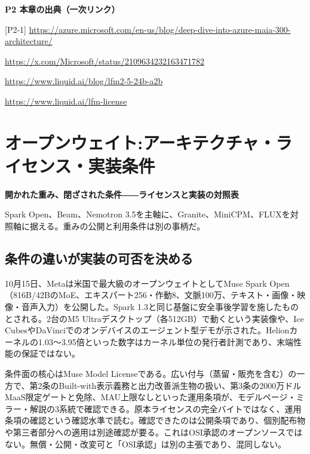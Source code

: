 \documentclass[lualatex,a4paper,10pt]{jlreq}
\begin{document}
\begin{tcolorbox}[colback=white,colframe=SurveyRule,arc=1mm,boxrule=0.4pt,left=2mm,right=2mm]
\textbf{P2 本章の出典（一次リンク）}\par\footnotesize
[P2-1] \url{https://azure.microsoft.com/en-us/blog/deep-dive-into-azure-maia-300-architecture/}\par
[P2-2] \url{https://x.com/Microsoft/status/2109634232163471782}\par
[P2-3] \url{https://www.liquid.ai/blog/lfm2-5-24b-a2b}\par
[P2-4] \url{https://www.liquid.ai/lfm-license}\par
\end{tcolorbox}

\section{オープンウェイト:アーキテクチャ・ライセンス・実装条件}
\label{sec:P3}

{\Large\bfseries 開かれた重み、閉ざされた条件――ライセンスと実装の対照表\par}
\smallskip
{\color{SurveyMuted}Spark Open、Beam、Nemotron 3.5を主軸に、Granite、MiniCPM、FLUXを対照軸に据える。重みの公開と利用条件は別の事柄だ。\par}
\bigskip

\subsection*{条件の違いが実装の可否を決める}
10月15日、Metaは米国で最大級のオープンウェイトとしてMuse Spark Open（816B/42BのMoE、エキスパート256・作動8、文脈100万、テキスト・画像・映像・音声入力）を公開した。Spark 1.3と同じ基盤に安全事後学習を施したものとされる。2台のM5 Ultraデスクトップ（各512GB）で動くという実装像や、Ice CubesやDaVinciでのオンデバイスのエージェント型デモが示された。Helionカーネルの1.03〜3.95倍といった数字はカーネル単位の発行者計測であり、末端性能の保証ではない。

条件面の核心はMuse Model Licenseである。広い付与（蒸留・販売を含む）の一方で、第2条のBuilt-with表示義務と出力改善派生物の扱い、第3条の2000万ドルMaaS限定ゲートと免除、MAU上限なしといった運用条項が、モデルページ・ミラー・解説の3系統で確認できる。原本ライセンスの完全バイトではなく、運用条項の確認という確認水準で読む。確認できたのは公開条項であり、個別配布物や第三者部分への適用は別途確認が要る。これはOSI承認のオープンソースではない。無償・公開・改変可と「OSI承認」は別の主張であり、混同しない。
\end{document}

